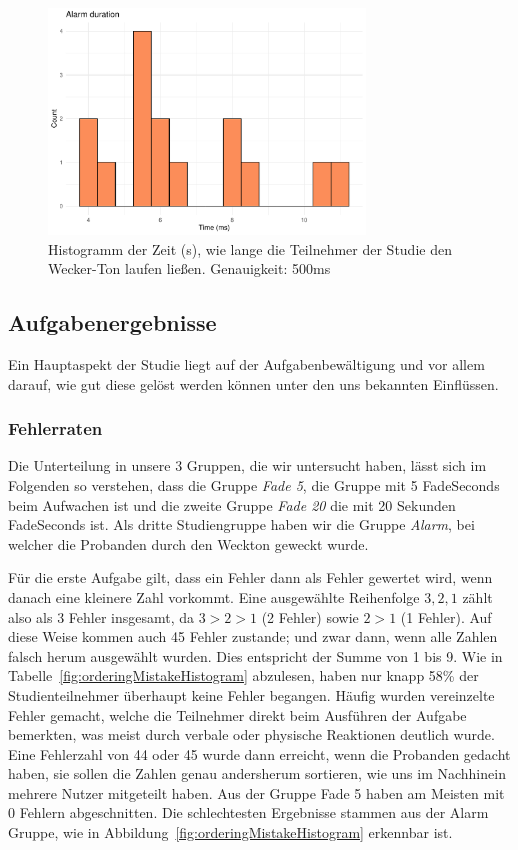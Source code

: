 \begin{figure}[H]
	\centering
	\includegraphics[width=0.75\textwidth]{./_StudyResults/alarmDurationHist}
	\caption{Histogramm der Zeit (s), wie lange die Teilnehmer der Studie den Wecker-Ton laufen ließen. Genauigkeit: 500ms}
	\label{fig:alarmDurationHist}
\end{figure}

\subsection{Aufgabenergebnisse} 

Ein Hauptaspekt der Studie liegt auf der Aufgabenbewältigung und vor allem darauf, wie gut diese gelöst werden können unter den uns bekannten Einflüssen. 

\subsubsection{Fehlerraten}

Die Unterteilung in unsere 3 Gruppen, die wir untersucht haben, lässt sich im Folgenden so verstehen, dass die Gruppe \textit{Fade 5}, die Gruppe mit 5 FadeSeconds beim Aufwachen ist und die zweite Gruppe \textit{Fade 20} die mit 20 Sekunden FadeSeconds ist. Als dritte Studiengruppe haben wir die Gruppe \textit{Alarm}, bei welcher die Probanden durch den Weckton geweckt wurde.

Für die erste Aufgabe gilt, dass ein Fehler dann als Fehler gewertet wird, wenn danach eine kleinere Zahl vorkommt. Eine ausgewählte Reihenfolge $3, 2, 1$ zählt also als 3 Fehler insgesamt, da $3 > 2 > 1$ (2 Fehler) sowie $2 > 1$ (1 Fehler). Auf diese Weise kommen auch 45 Fehler zustande; und zwar dann, wenn alle Zahlen falsch herum ausgewählt wurden. Dies entspricht der Summe von 1 bis 9.
Wie in Tabelle~\ref{fig:orderingMistakeHistogram} abzulesen, haben nur knapp 58\% der Studienteilnehmer überhaupt keine Fehler begangen. Häufig wurden vereinzelte Fehler gemacht, welche die Teilnehmer direkt beim Ausführen der Aufgabe bemerkten, was meist durch verbale oder physische Reaktionen deutlich wurde. 
Eine Fehlerzahl von 44 oder 45 wurde dann erreicht, wenn die Probanden gedacht haben, sie sollen die Zahlen genau andersherum sortieren, wie uns im Nachhinein mehrere Nutzer mitgeteilt haben.
Aus der Gruppe Fade 5 haben am Meisten mit 0 Fehlern abgeschnitten. Die schlechtesten Ergebnisse stammen aus der Alarm Gruppe, wie in Abbildung~\ref{fig:orderingMistakeHistogram} erkennbar ist. 


